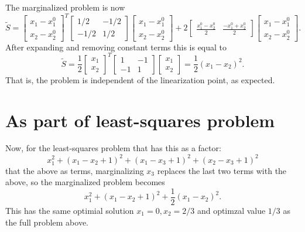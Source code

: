 The marginalized problem is now
$$
  \tilde S = \begin{bmatrix}
    x_1 - x_1^0 \\
    x_2 - x_2^0
  \end{bmatrix}^T
  \begin{bmatrix}
    1/2 & -1/2 \\ -1/2 & 1/2
  \end{bmatrix}
  \begin{bmatrix}
    x_1 - x_1^0 \\
    x_2 - x_2^0
  \end{bmatrix}
  + 2 \begin{bmatrix}
    \frac{x_1^0 - x_2^0}{2} & \frac{-x_1^0 + x_2^0}{2}
  \end{bmatrix} \begin{bmatrix}
    x_1 - x_1^0 \\
    x_2 - x_2^0
  \end{bmatrix}.
$$
After expanding and removing constant terms this is equal to
$$
  \tilde S = \frac{1}{2} \begin{bmatrix}
    x_1 \\ x_2
  \end{bmatrix}^T \begin{bmatrix}
    1 & -1 \\ -1 & 1
  \end{bmatrix}
  \begin{bmatrix}
    x_1 \\ x_2
  \end{bmatrix} = \frac{1}{2} (x_1 - x_2)^2.
$$
That is, the problem is independent of the linearization point, as expected.

\section{As part of least-squares problem}

Now, for the least-squares problem that has this as a factor:
$$
  x_1^2 + (x_1-x_2+1)^2 + (x_1-x_3+1)^2 + (x_2-x_3+1)^2
$$
that the above as terms, marginalizing $x_3$ replaces the last two terms with the above, so the marginalized problem becomes
$$
  x_1^2 + (x_1-x_2+1)^2 + \frac{1}{2} (x_1-x_2)^2.
$$
This has the same optimial solution $x_1=0, x_2=2/3$ and optimzal value $1/3$ as the full problem above.

